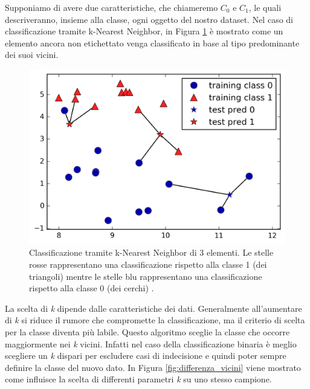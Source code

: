 \documentclass[a4paper,12pt]{report}
\begin{document}
Supponiamo di avere due  caratteristiche, che chiameremo $C_{0}$ e $C_{1}$, le quali descriveranno, insieme alla classe, ogni oggetto del nostro dataset. Nel caso di classificazione tramite k-Nearest Neighbor, in Figura \ref{fig:knearest_3_vicini} è mostrato come un elemento ancora non etichettato venga classificato in base al tipo predominante dei suoi vicini.


\begin{figure}[ht]
    \centering
    \includegraphics[scale = 0.2]{images/knearest_3_vicini.png}
    \caption{Classificazione tramite k-Nearest Neighbor di 3 elementi. Le stelle rosse rappresentano una classificazione rispetto alla classe 1 (dei triangoli) mentre le stelle blu rappresentano una classificazione rispetto alla classe 0 (dei cerchi) \cite{figure_copyright}.}
    \label{fig:knearest_3_vicini}
\end{figure}

La scelta di \textit{k} dipende dalle caratteristiche dei dati. Generalmente all'aumentare di \textit{k} si riduce il rumore che compromette la classificazione, ma il criterio di scelta per la classe diventa più labile.
Questo algoritmo sceglie la classe che occorre maggiormente nei \textit{k} vicini. Infatti nel caso della classificazione binaria è meglio scegliere un \textit{k} dispari per escludere casi di indecisione e quindi poter sempre definire la classe del nuovo dato. In Figura \ref{fig:differenza_vicini} viene mostrato come influisce la scelta di differenti parametri \textit{k} su uno stesso campione.
\end{document}
